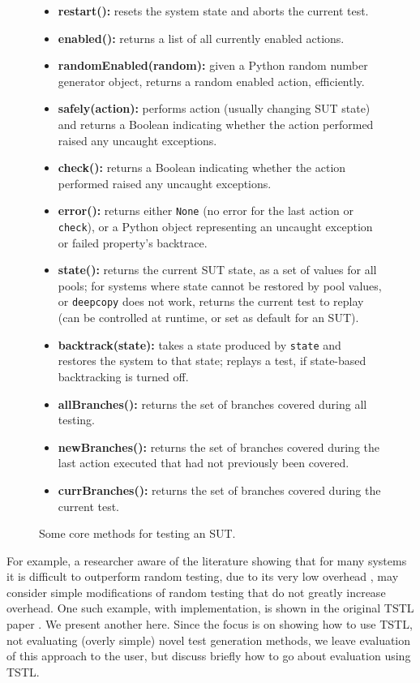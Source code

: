 \begin{figure}
{\scriptsize
\begin{itemize}
\item {\bf restart():}  resets the system state and aborts the current test. 
\item {\bf enabled():} returns a list of all currently enabled actions.
\item {\bf randomEnabled(random):}  given a Python random number generator object, returns a random enabled action, efficiently.
\item {\bf safely(action):} performs action (usually changing SUT state)  and returns a Boolean indicating whether the action performed raised any uncaught exceptions. 
\item {\bf check():} returns a Boolean indicating whether the action performed raised any uncaught exceptions.
\item {\bf error():} returns either {\tt None} (no error for the last action or {\tt check}), or a Python object representing an uncaught exception or failed property's backtrace.
\item {\bf state():} returns the current SUT state, as a set of values for all pools; for systems where state cannot be restored by pool values, or {\tt deepcopy} does not work, returns the current test to replay (can be controlled at runtime, or set as default for an SUT).
\item {\bf backtrack(state):} takes a state produced by {\tt state} and restores the system to that state; replays a test, if state-based backtracking is turned off.
\item {\bf allBranches():} returns the set of branches covered during all testing.
\item {\bf newBranches():} returns the set of branches covered during the last action executed that had not previously been covered.
\item {\bf currBranches():} returns the set of branches covered during the current test.
\end{itemize} 
}
\caption{Some core methods for testing an SUT.}
\label{methods}
\end{figure}

For example, a researcher aware of the literature showing that for many systems it is difficult to outperform random testing, due to its very low overhead \cite{ISSRE12,ISSTA12}, may consider simple modifications of random testing that do not greatly increase overhead.  One such example, with implementation, is shown in the original TSTL paper \cite{NFM15}.  We present another here.  Since the focus is on showing how to use TSTL, not evaluating (overly simple) novel test generation methods, we leave evaluation of this approach to the user, but discuss briefly how to go about evaluation using TSTL.

